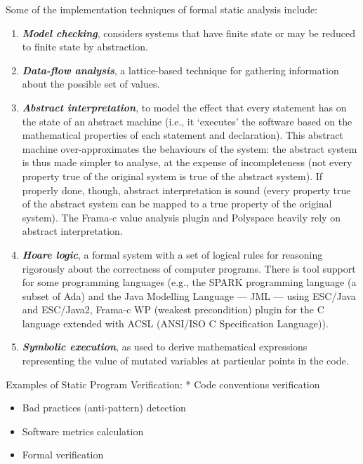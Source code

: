 Some of the implementation techniques of formal static analysis include:

\begin{enumerate}
\def\labelenumi{\arabic{enumi}.}
\item
  \emph{\textbf{Model checking}}, considers systems that have finite
  state or may be reduced to finite state by abstraction.
\item
  \emph{\textbf{Data-flow analysis}}, a lattice-based technique for
  gathering information about the possible set of values.
\item
  \emph{\textbf{Abstract interpretation}}, to model the effect that
  every statement has on the state of an abstract machine (i.e., it
  `executes' the software based on the mathematical properties of each
  statement and declaration). This abstract machine over-approximates
  the behaviours of the system: the abstract system is thus made simpler
  to analyse, at the expense of incompleteness (not every property true
  of the original system is true of the abstract system). If properly
  done, though, abstract interpretation is sound (every property true of
  the abstract system can be mapped to a true property of the original
  system). The Frama-c value analysis plugin and Polyspace heavily rely
  on abstract interpretation.
\item
  \emph{\textbf{Hoare logic}}, a formal system with a set of logical
  rules for reasoning rigorously about the correctness of computer
  programs. There is tool support for some programming languages (e.g.,
  the SPARK programming language (a subset of Ada) and the Java
  Modelling Language --- JML --- using ESC/Java and ESC/Java2, Frama-c
  WP (weakest precondition) plugin for the C language extended with ACSL
  (ANSI/ISO C Specification Language)).
\item
  \emph{\textbf{Symbolic execution}}, as used to derive mathematical
  expressions representing the value of mutated variables at particular
  points in the code.
\end{enumerate}

Examples of Static Program Verification: * Code conventions verification

\begin{itemize}
\item
  Bad practices (anti-pattern) detection
\item
  Software metrics calculation
\item
  Formal verification
\end{itemize}


